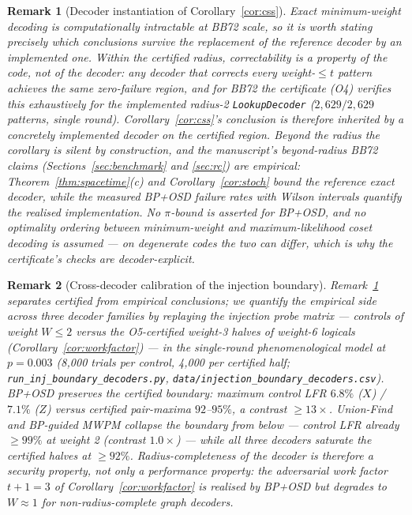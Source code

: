 \documentclass[11pt,a4paper]{article}
\newtheorem{remark}{Remark}
\begin{document}
\begin{remark}[Decoder instantiation of Corollary~\ref{cor:css}]
\label{rem:decoder-inst}
Exact minimum-weight decoding is computationally intractable at BB72
scale, so it is worth stating precisely which conclusions survive the
replacement of the reference decoder by an implemented one.
\emph{Within the certified radius}, correctability is a property of
the code, not of the decoder: any decoder that corrects every
weight-$\le t$ pattern achieves the same zero-failure region, and for
BB72 the certificate (O4) verifies this exhaustively for the
implemented radius-2 \texttt{LookupDecoder} ($2{,}629/2{,}629$
patterns, single round). Corollary~\ref{cor:css}'s conclusion is
therefore inherited by a concretely implemented decoder on the
certified region.
\emph{Beyond the radius} the corollary is silent by construction, and
the manuscript's beyond-radius BB72 claims (Sections~\ref{sec:benchmark}
and \ref{sec:rc}) are empirical: Theorem~\ref{thm:spacetime}(c) and
Corollary~\ref{cor:stoch} bound the reference exact decoder, while the
measured BP+OSD failure rates with Wilson intervals quantify the
realised implementation. No $\pi$-bound is asserted for BP+OSD, and no
optimality ordering between minimum-weight and maximum-likelihood coset
decoding is assumed --- on degenerate codes the two can differ, which is
why the certificate's checks are decoder-explicit.
\end{remark}

\begin{remark}[Cross-decoder calibration of the injection boundary]
\label{rem:crossdec}
Remark~\ref{rem:decoder-inst} separates certified from empirical
conclusions; we quantify the empirical side across three decoder
families by replaying the injection probe matrix --- controls of weight
$W\le2$ versus the O5-certified weight-3 halves of weight-6 logicals
(Corollary~\ref{cor:workfactor}) --- in the single-round phenomenological
model at $p=0.003$ (8{,}000 trials per control, 4{,}000 per certified
half; \texttt{run\_inj\_boundary\_decoders.py},
\texttt{data/injection\_boundary\_decoders.csv}). BP+OSD preserves the
certified boundary: maximum control LFR $6.8\%$ ($X$) / $7.1\%$ ($Z$)
versus certified pair-maxima $92$--$95\%$, a contrast $\ge13\times$.
Union-Find and BP-guided MWPM collapse the boundary from below ---
control LFR already $\ge99\%$ at weight 2 (contrast $1.0\times$) ---
while all three decoders saturate the certified halves at $\ge92\%$.
Radius-completeness of the decoder is therefore a \emph{security}
property, not only a performance property: the adversarial work factor
$t{+}1=3$ of Corollary~\ref{cor:workfactor} is realised by BP+OSD but
degrades to $W\approx1$ for non-radius-complete graph decoders.
\end{remark}
\end{document}

